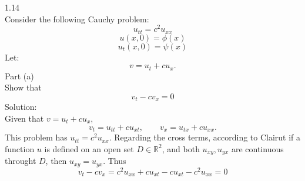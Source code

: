 \documentclass{article}
\begin{document}
\large 1.14\\
\normalsize
Consider the following Cauchy problem:\\
\[u_{tt} = c^2u_{xx}\]
\[u(x,0) = \phi(x)\]
\[u_{t}(x,0) = \psi(x)\]
Let:\\
\[v = u_{t} + cu_{x}.\]
Part (a)\\
Show that \\
\[v_{t} - cv_{x} = 0\]
Solution:\\
Given that $v = u_{t} + cu_{x}$,
\[v_{t} = u_{tt} + cu_{xt},\qquad v_{x} = u_{tx} + cu_{xx}.\]
This problem has $ u_{tt} = c^2u_{xx}$. Regarding the cross terms, according to Clairut if a function $u$ is defined on an open set $D \in \mathbb{R}^2 $, and both $u_{xy}, u_{yx}$ are continuous throught $D$, then $ u_{xy} = u_{yx}$. Thus
\[ v_{t} - cv_{x} = c^2u_{xx}+cu_{xt} - cu_{xt} - c^2u_{xx} =0\]
\end{document}
